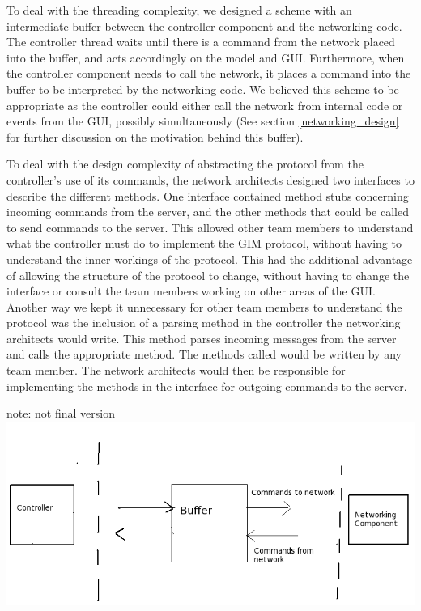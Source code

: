 To deal with the threading complexity, we designed a scheme with an intermediate buffer between the controller component and the networking code. The controller thread waits until there is a command from the network placed into the buffer, and acts accordingly on the model and GUI. Furthermore, when the controller component needs to call the network, it places a command into the buffer to be interpreted by the networking code. We believed this scheme to be appropriate as the controller could either call the network from internal code or events from the GUI, possibly simultaneously (See section \ref{networking_design} for further discussion on the motivation behind this buffer).

To deal with the design complexity of abstracting the protocol from the controller's use of its commands, the network architects designed two interfaces to describe the different methods. One interface contained method stubs concerning incoming commands from the server, and the other methods that could be called to send commands to the server. This allowed other team members to understand what the controller must do to implement the GIM protocol, without having to understand the inner workings of the protocol. This had the additional advantage of allowing the structure of the protocol to change, without having to change the interface or consult the team members working on other areas of the GUI. Another way we kept it unnecessary for other team members to understand the protocol was the inclusion of a parsing method in the controller the networking architects would write. This method parses incoming messages from the server and calls the appropriate method. The methods called would be written by any team member. The network architects would then be responsible for implementing the methods in the interface for outgoing commands to the server.

note: not final version
\includegraphics[scale=0.65]{Design/diagrams/buffer.png}

